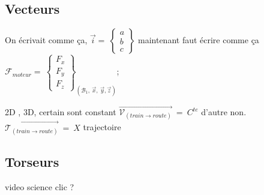 \documentclass[
	11pt, %
	fleqn, %
	a4paper, %
]{LegrandOrangeBook}
\begin{document}
\subsection{Vecteurs}\label{Vecteurs}

On écrivait comme ça,  $\Vec{i}=\ \begin{Bmatrix} a\\ b \\ c \end{Bmatrix} $  maintenant faut écrire comme ça 
 {$\mathcal{F}_{moteur} =\ \begin{Bmatrix}
F_{x}\\
F_{y}\\
F_{z}
\end{Bmatrix}_{( \mathcal{B}_{1} ,\ \vec{x} ,\ \vec{y} ,\vec{z})}$};

2D , 3D, certain sont constant $\overrightarrow{\mathcal{V}_{(train\rightarrow route)}} \ =\ C^{te}$ d'autre non. $\overrightarrow{\mathcal{T}_{(train\rightarrow route)}} \ =\ X$ trajectoire



\subsection{Torseurs}
video science clic ?
\end{document}

